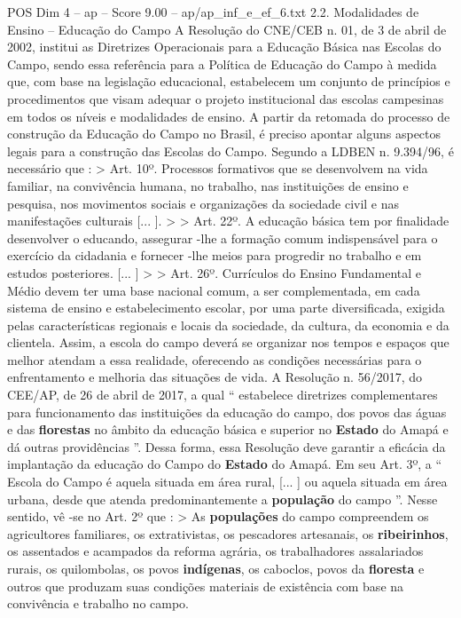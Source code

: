 \begin{textsample}{POS Dim 4 – ap – Score 9.00 – ap/ap\_inf\_e\_ef\_6.txt}  \label{ex:f4_pos_235}
2.2.
Modalidades de Ensino – Educação do Campo A Resolução do CNE/CEB n. 01, de 3 de abril de 2002, institui as Diretrizes Operacionais para a Educação Básica nas Escolas do Campo, sendo essa referência para a Política de Educação do Campo à medida que, com base na legislação educacional, estabelecem um conjunto de princípios e procedimentos que visam adequar o projeto institucional das escolas campesinas em todos os níveis e modalidades de ensino.
A partir da retomada do processo de construção da Educação do Campo no Brasil, é preciso apontar alguns aspectos legais para a construção das Escolas do Campo.
Segundo a LDBEN n. 9.394/96, é necessário que : > Art. 10º.
Processos formativos que se desenvolvem na vida familiar, na convivência humana, no trabalho, nas instituições de ensino e pesquisa, nos movimentos sociais e organizações da sociedade civil e nas manifestações culturais [... ]. > > Art. 22º.
A educação básica tem por finalidade desenvolver o educando, assegurar -lhe a formação comum indispensável para o exercício da cidadania e fornecer -lhe meios para progredir no trabalho e em estudos posteriores. [... ] > > Art. 26º.
Currículos do Ensino Fundamental e Médio devem ter uma base nacional comum, a ser complementada, em cada sistema de ensino e estabelecimento escolar, por uma parte diversificada, exigida pelas características regionais e locais da sociedade, da cultura, da economia e da clientela.
Assim, a escola do campo deverá se organizar nos tempos e espaços que melhor atendam a essa realidade, oferecendo as condições necessárias para o enfrentamento e melhoria das situações de vida.
A Resolução n. 56/2017, do CEE/AP, de 26 de abril de 2017, a qual “ estabelece diretrizes complementares para funcionamento das instituições da educação do campo, dos povos das águas e das \textbf{florestas} no âmbito da educação básica e superior no \textbf{Estado} do Amapá e dá outras providências ”.
Dessa forma, essa Resolução deve garantir a eficácia da implantação da educação do Campo do \textbf{Estado} do Amapá.
Em seu Art. 3º, a “ Escola do Campo é aquela situada em área rural, [... ] ou aquela situada em área urbana, desde que atenda predominantemente a \textbf{população} do campo ”.
Nesse sentido, vê -se no Art. 2º que : > As \textbf{populações} do campo compreendem os agricultores familiares, os extrativistas, os pescadores artesanais, os \textbf{ribeirinhos}, os assentados e acampados da reforma agrária, os trabalhadores assalariados rurais, os quilombolas, os povos \textbf{indígenas}, os caboclos, povos da \textbf{floresta} e outros que produzam suas condições materiais de existência com base na convivência e trabalho no campo.

\end{textsample}
